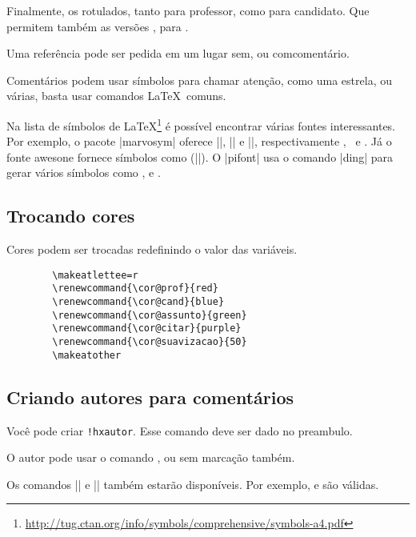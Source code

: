 \documentclass{article}
\begin{document}
    Finalmente, os rotulados, tanto para professor, como para candidato. Que permitem também as versões , para .
    
    Uma referência pode ser pedida em um lugar sem\favorcitar, ou com\favorcitar[o experimento] comentário.
    
    Comentários podem usar símbolos para chamar atenção, como uma estrela, ou várias, basta usar comandos \LaTeX\  comuns.
    
    Na lista de símbolos de \LaTeX\footnote{\url{http://tug.ctan.org/info/symbols/comprehensive/symbols-a4.pdf}} é possível encontrar várias fontes interessantes. Por exemplo, o pacote |marvosym| oferece |\Checkedbox|, |\CrossedBox| e |\HollowBox|, respectivamente \Checkedbox, \CrossedBox \  e \HollowBox. Já o fonte awesone fornece símbolos como \faCheckSquareO(|\faCheckSquareO|). O |pifont| usa o comando |ding| para gerar vários símbolos como , e .
    
    \subsection{Trocando cores}
    Cores podem ser trocadas redefinindo o valor das variáveis.
    \begin{verbatim}
        \makeatlettee=r
        \renewcommand{\cor@prof}{red}
        \renewcommand{\cor@cand}{blue}
        \renewcommand{\cor@assunto}{green}
        \renewcommand{\cor@citar}{purple}
        \renewcommand{\cor@suavizacao}{50}
        \makeatother
    \end{verbatim}
    
    \subsection{Criando autores para comentários}
    Você pode criar  \verb*|!hxautor|. Esse comando deve ser dado no preambulo.
    
    O autor pode usar o comando , ou sem marcação também.
    
    Os comandos |\xexeox| e |\xexeorx| também estarão disponíveis. Por exemplo,  e  são válidas.
    
\end{document}
